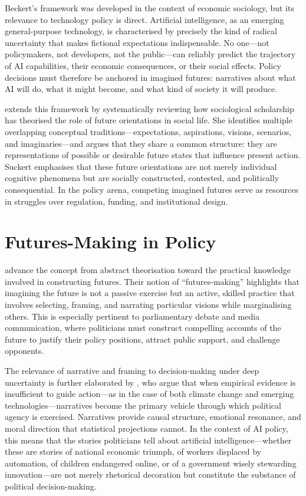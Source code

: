 Beckert's framework was developed in the context of economic sociology, but its relevance to technology policy is direct. Artificial intelligence, as an emerging general-purpose technology, is characterised by precisely the kind of radical uncertainty that makes fictional expectations indispensable. No one---not policymakers, not developers, not the public---can reliably predict the trajectory of AI capabilities, their economic consequences, or their social effects. Policy decisions must therefore be anchored in imagined futures: narratives about what AI will do, what it might become, and what kind of society it will produce.

\textcite{suckert2022} extends this framework by systematically reviewing how sociological scholarship has theorised the role of future orientations in social life. She identifies multiple overlapping conceptual traditions---expectations, aspirations, visions, scenarios, and imaginaries---and argues that they share a common structure: they are representations of possible or desirable future states that influence present action. Suckert emphasises that these future orientations are not merely individual cognitive phenomena but are socially constructed, contested, and politically consequential. In the policy arena, competing imagined futures serve as resources in struggles over regulation, funding, and institutional design.

\section{Futures-Making in Policy}

\textcite{thompson2022} advance the concept from abstract theorisation toward the practical knowledge involved in constructing futures. Their notion of ``futures-making'' highlights that imagining the future is not a passive exercise but an active, skilled practice that involves selecting, framing, and narrating particular visions while marginalising others. This is especially pertinent to parliamentary debate and media communication, where politicians must construct compelling accounts of the future to justify their policy positions, attract public support, and challenge opponents.

The relevance of narrative and framing to decision-making under deep uncertainty is further elaborated by \textcite{constantino2021}, who argue that when empirical evidence is insufficient to guide action---as in the case of both climate change and emerging technologies---narratives become the primary vehicle through which political agency is exercised. Narratives provide causal structure, emotional resonance, and moral direction that statistical projections cannot. In the context of AI policy, this means that the stories politicians tell about artificial intelligence---whether these are stories of national economic triumph, of workers displaced by automation, of children endangered online, or of a government wisely stewarding innovation---are not merely rhetorical decoration but constitute the substance of political decision-making.

